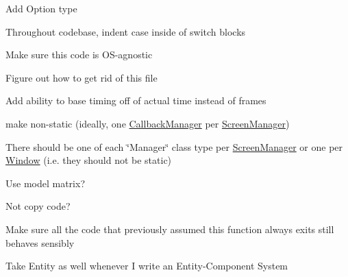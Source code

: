 
\begin{DoxyRefList}
\item[\label{todo__todo000002}%
\Hypertarget{todo__todo000002}%
Namespace \hyperlink{namespacenta}{nta} ]Add Option type 

Throughout codebase, indent {\ttfamily case} inside of {\ttfamily switch} blocks 

Make sure this code is O\+S-\/agnostic 

Figure out how to get rid of this file  
\item[\label{todo__todo000001}%
\Hypertarget{todo__todo000001}%
Class \hyperlink{classnta_1_1CallbackManager}{nta\+:\+:Callback\+Manager} ]Add ability to base timing off of actual time instead of frames 

make non-\/static (ideally, one \hyperlink{classnta_1_1CallbackManager}{Callback\+Manager} per \hyperlink{classnta_1_1ScreenManager}{Screen\+Manager})  
\item[\label{todo__todo000003}%
\Hypertarget{todo__todo000003}%
Class \hyperlink{classnta_1_1ErrorManager}{nta\+:\+:Error\+Manager} ]There should be one of each \char`\"{}\+Manager\char`\"{} class type per \hyperlink{classnta_1_1ScreenManager}{Screen\+Manager} or one per \hyperlink{classnta_1_1Window}{Window} (i.\+e. they should not be static)  
\item[\label{todo__todo000013}%
\Hypertarget{todo__todo000013}%
Member \hyperlink{structnta_1_1Glyph_a3b2afa4370140736d9d1b28de20d2105}{nta\+:\+:Glyph\+:\+:Glyph} (crvec4 pos\+Rect, crvec4 uv\+Rect, G\+Luint tex, float d, crvec4 col, float angle)]Use model matrix?  
\item[\label{todo__todo000016}%
\Hypertarget{todo__todo000016}%
Member \hyperlink{classnta_1_1IOManager_abbfd9da05b22aa488043a19344d38e0a}{nta\+:\+:I\+O\+Manager\+:\+:read\+File\+To\+Buffer} (crstring file\+Path, std\+::string \&buffer)]Not copy code?  
\item[\label{todo__todo000025}%
\Hypertarget{todo__todo000025}%
Member \hyperlink{classnta_1_1Logger_a22e0cfbb0e04de2c377cdd5297c39eee}{nta\+:\+:Logger\+:\+:write\+Error\+To\+Log} (crstring error, Error\+Type type=O\+T\+H\+ER)]Make sure all the code that previously assumed this function always exits still behaves sensibly  
\item[\label{todo__todo000009}%
\Hypertarget{todo__todo000009}%
Member \hyperlink{classnta_1_1Observer_a828574b2ddb58a600311d2da9c6cd0a5}{nta\+:\+:Observer\+:\+:on\+Notify} (const \hyperlink{structnta_1_1Event}{Event} \&)=0]Take Entity as well whenever I write an Entity-\/\+Component System  

\end{DoxyRefList}
